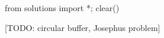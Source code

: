 \begin{python0}
from solutions import *; clear()
\end{python0}

[TODO: circular buffer, Josephus problem]
